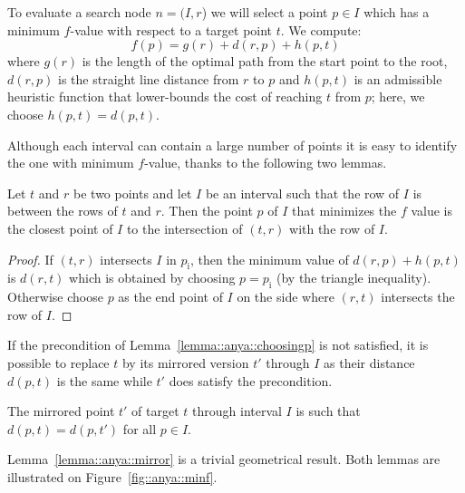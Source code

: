 To evaluate a search node $n = (I, r$) we will select a point $p \in I$ 
which has a minimum $f$-value with respect to a target point $t$.
We compute: 
\begin{equation}
\label{eq::f}
f(p) = g(r) + d(r, p) + h(p, t)
\end{equation}
where $g(r)$ is the length of the optimal path from the start point to 
the root, $d(r, p)$ is the straight line distance from $r$ to $p$
and $h(p, t)$ is an admissible heuristic function that lower-bounds the cost of reaching $t$ from $p$; here, we choose $h(p,t) = d(p,t)$.

Although each interval can contain a large number of points it is easy to
identify the one with minimum $f$-value, 
thanks to the following two lemmas.  

\begin{lemma}\label{lemma::anya::choosingp}
  Let $t$ and $r$ be two points 
  and let $I$ be an interval 
  such that the row of $I$ is between the rows of $t$ and $r$.  
  Then the point $p$ of $I$ 
  that minimizes the $f$ value 
  is the closest point of $I$ to the intersection of $(t,r)$ 
  with the row of $I$.  
\end{lemma}

\begin{proof}
  If $(t,r)$ intersects $I$ in $p_\mathrm{i}$, 
  then the minimum value of $d(r,p) + h(p,t)$ 
  is $d(r,t)$ which is obtained 
  by choosing $p = p_{\mathrm{i}}$ (by the triangle inequality).  
  Otherwise choose $p$ as the end point of $I$ 
  on the side where $(r,t)$ intersects the row of $I$.  
\end{proof}

If the precondition of Lemma~\ref{lemma::anya::choosingp} is not satisfied, 
it is possible to replace $t$ by its mirrored version $t'$ through $I$ 
as their distance $d(p,t)$ is the same 
while $t'$ does satisfy the precondition.  

\begin{lemma}
\label{lemma::anya::mirror}
  The mirrored point $t'$ of target $t$ 
  through interval $I$ is such that   
  $d(p,t) = d(p,t')$ for all $p \in I$.  
\end{lemma}

Lemma~\ref{lemma::anya::mirror} is a trivial geometrical result.  
Both lemmas are illustrated on Figure~\ref{fig::anya::minf}.  


